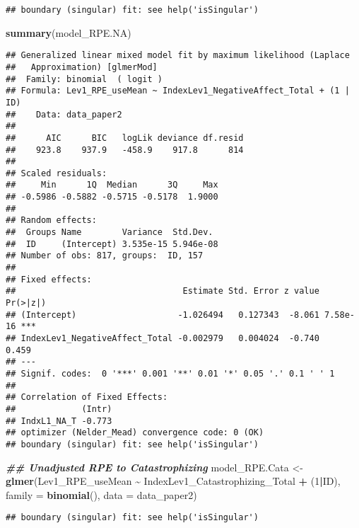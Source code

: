 \documentclass[
  12pt,
]{article}
\newenvironment{Shaded}{\begin{snugshade}}{\end{snugshade}}
\newcommand{\AttributeTok}[1]{\textcolor[rgb]{0.13,0.29,0.53}{#1}}
\newcommand{\DecValTok}[1]{\textcolor[rgb]{0.00,0.00,0.81}{#1}}
\newcommand{\DocumentationTok}[1]{\textcolor[rgb]{0.56,0.35,0.01}{\textbf{\textit{#1}}}}
\newcommand{\FunctionTok}[1]{\textcolor[rgb]{0.13,0.29,0.53}{\textbf{#1}}}
\newcommand{\NormalTok}[1]{#1}
\newcommand{\OtherTok}[1]{\textcolor[rgb]{0.56,0.35,0.01}{#1}}
\newcommand{\SpecialCharTok}[1]{\textcolor[rgb]{0.81,0.36,0.00}{\textbf{#1}}}
\begin{document}
\begin{verbatim}
## boundary (singular) fit: see help('isSingular')
\end{verbatim}

\begin{Shaded}
\begin{Highlighting}[]
\FunctionTok{summary}\NormalTok{(model\_RPE.NA)}
\end{Highlighting}
\end{Shaded}

\begin{verbatim}
## Generalized linear mixed model fit by maximum likelihood (Laplace
##   Approximation) [glmerMod]
##  Family: binomial  ( logit )
## Formula: Lev1_RPE_useMean ~ IndexLev1_NegativeAffect_Total + (1 | ID)
##    Data: data_paper2
## 
##      AIC      BIC   logLik deviance df.resid 
##    923.8    937.9   -458.9    917.8      814 
## 
## Scaled residuals: 
##     Min      1Q  Median      3Q     Max 
## -0.5986 -0.5882 -0.5715 -0.5178  1.9000 
## 
## Random effects:
##  Groups Name        Variance  Std.Dev. 
##  ID     (Intercept) 3.535e-15 5.946e-08
## Number of obs: 817, groups:  ID, 157
## 
## Fixed effects:
##                                 Estimate Std. Error z value Pr(>|z|)    
## (Intercept)                    -1.026494   0.127343  -8.061 7.58e-16 ***
## IndexLev1_NegativeAffect_Total -0.002979   0.004024  -0.740    0.459    
## ---
## Signif. codes:  0 '***' 0.001 '**' 0.01 '*' 0.05 '.' 0.1 ' ' 1
## 
## Correlation of Fixed Effects:
##             (Intr)
## IndxL1_NA_T -0.773
## optimizer (Nelder_Mead) convergence code: 0 (OK)
## boundary (singular) fit: see help('isSingular')
\end{verbatim}

\begin{Shaded}
\begin{Highlighting}[]
 \DocumentationTok{\#\# Unadjusted RPE to Catastrophizing}
\NormalTok{model\_RPE.Cata }\OtherTok{\textless{}{-}} \FunctionTok{glmer}\NormalTok{(Lev1\_RPE\_useMean }\SpecialCharTok{\textasciitilde{}}\NormalTok{ IndexLev1\_Catastrophizing\_Total }\SpecialCharTok{+}\NormalTok{ (}\DecValTok{1}\SpecialCharTok{|}\NormalTok{ID), }\AttributeTok{family =} \FunctionTok{binomial}\NormalTok{(), }\AttributeTok{data =}\NormalTok{ data\_paper2)}
\end{Highlighting}
\end{Shaded}

\begin{verbatim}
## boundary (singular) fit: see help('isSingular')
\end{verbatim}
\end{document}

